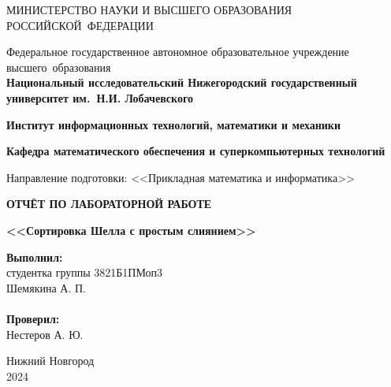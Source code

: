 \documentclass[]{article}
\theoremstyle{remark}
\theoremstyle{definition}
\begin{document}
\begin{titlepage}

\begin{center}
\MakeUppercase{Министерство науки и высшего образования Российской~Федерации}
\end{center}

\begin{center}
Федеральное государственное автономное образовательное учреждение высшего~образования \\
\textbf{Национальный исследовательский Нижегородский государственный университет им.~Н.И. Лобачевского}
\end{center}

\begin{center}
\textbf{Институт информационных технологий, математики и механики}
\end{center}
\begin{center}
\textbf{Кафедра математического обеспечения и суперкомпьютерных технологий}
\end{center}
\begin{center}
Направление подготовки: <<Прикладная математика и информатика>>
\end{center}

\vspace{3em}

\begin{center}
\textbf{\Large\MakeUppercase{Отчёт по лабораторной работе}} \\
\end{center}
\begin{center}
\textbf{\Large<<Сортировка Шелла с простым слиянием>>} \\
\end{center}

\vspace{5em}

\newbox{\lbox}
\newlength{\maxl}
\setlength{\maxl}{\wd\lbox}
\hfill\parbox{7cm}{
\hspace*{5cm}\hspace*{-5cm}\textbf{Выполнил:} \\ студентка группы 	3821Б1ПМоп3 \\ Шемякина А. П.\\
\\

\hspace*{5cm}\hspace*{-5cm}\textbf{Проверил:} \\ Нестеров А. Ю.
}
\vspace{\fill}

\begin{center} Нижний Новгород \\ 2024 \end{center}

\end{titlepage}
\end{document}
